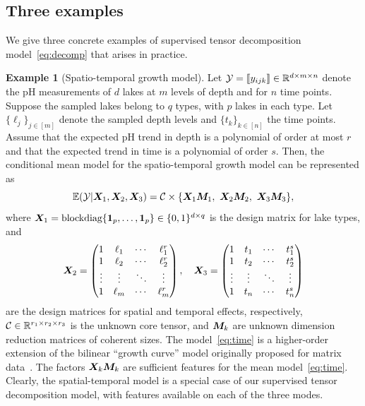 \documentclass[12pt]{article}
\theoremstyle{plain}
\theoremstyle{definition}
\newtheorem{example}{Example}
\begin{document}
\subsection{Three examples}
We give three concrete examples of supervised tensor decomposition model~\eqref{eq:decomp} that arises in practice. 
\begin{example}[Spatio-temporal growth model]
Let $\mathcal{Y}=\llbracket y_{ijk} \rrbracket\in\mathbb{R}^{d \times m\times n}$ denote the pH measurements of $d$ lakes at $m$ levels of depth and for $n$ time points. Suppose the sampled lakes belong to $q$ types, with $p$ lakes in each type. Let $\{\ell_j\}_{j\in[m]}$ denote the sampled depth levels and $\{t_k\}_{k\in[n]}$ the time points. Assume that the expected pH trend in depth is a polynomial of order at most $r$ and that the expected trend in time is a polynomial of order $s$. Then, the conditional mean model for the spatio-temporal growth model can be represented as
\begin{equation}\label{eq:time}
\mathbb{E}(\tY|\mX_1,\mX_2,\mX_3)=\tC\times\{\mX_1\mM_1,\ \mX_2\mM_2,\ \mX_3\mM_3\},
\end{equation}
where $\bm X_1=\text{blockdiag}\{\mathbf{1}_p,\ldots,\mathbf{1}_p\}\in \{0,1\}^{d\times q}$ is the design matrix for lake types, and
\[
\bm X_2=
\begin{pmatrix}
1 & \ell_1&\cdots &\ell^{r}_1\\
1 & \ell_2&\cdots &\ell^{r}_2\\
\vdots &\vdots&\ddots&\vdots\\
1&\ell_{m}&\cdots&\ell^{r}_{m}
\end{pmatrix},\quad
\bm X_3=
\begin{pmatrix}
1 & t_1&\cdots &t^{s}_1\\
1 & t_2&\cdots &t^{s}_2\\
\vdots &\vdots&\ddots&\vdots\\
1&t_{n}&\cdots&t^{s}_{n}
\end{pmatrix}
\]
are the design matrices for spatial and temporal effects, respectively, $\mathcal{C}\in\mathbb{R}^{r_1\times r_2\times r_3}$ is the unknown core tensor, and $\bm M_k$ are unknown dimension reduction matrices of coherent sizes. The model~\eqref{eq:time} is a higher-order extension of the bilinear ``growth curve'' model originally proposed for matrix data~\citep{gabriel1998generalised,potthoff1964generalized,srivastava2008models}. The factors $\bm X_k\bm M_k$ are sufficient features for the mean model~\eqref{eq:time}. Clearly, the spatial-temporal model is a special case of our supervised tensor decomposition model, with features available on each of the three modes.
\end{example}
\end{document}
